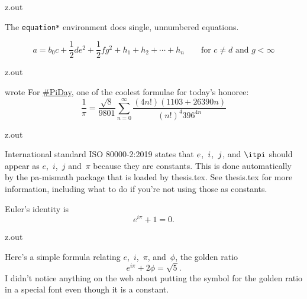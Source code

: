 \begin{VerbatimOut}{z.out}

The \verb+equation*+ environment does single, unnumbered equations.

\begin{equation*}
  a = b_0c + \frac12 de^2 + {\textstyle \frac12} fg^2
    + h_1 + h_2 + \cdots + h_n
    \qquad \text{for \(c \ne d\) and \(g < \infty\)}
\end{equation*}
\end{VerbatimOut}

\MyIO


\begin{VerbatimOut}{z.out}

\textcite{greene-2021-03-14}
wrote
  For
  \href{https://twitter.com/hashtag/PiDay?src=hashtag\_click\#PiDay}{\#PiDay},
  one of the coolest formulae for today's honoree:
  \[
    \frac 1\pi
    =
    \frac {\sqrt8} {9801}
    \sum_{n=0}^\infty
    \frac  {(4n!) (1103+26390n)}  {(n!)^4 396^{4n}}
  \]
\end{VerbatimOut}

\MyIO


\begin{VerbatimOut}{z.out}

International standard ISO 80000-2:2019
\cite{iso8000022019}
states that $\mit e$,~$\mit i$,~$\mit j$,
and $\itpi$ should appear as
$e$,~$i$,~$j$
and~$\pi$ because they are constants.
This is done automatically by the pa-mismath package
that is loaded by thesis.tex.
See thesis.tex for more information,
including what to do if you're not using those as constants.

Euler's identity is
\begin{equation*}
  e^{i\pi} + 1 = 0.
\end{equation*}
\end{VerbatimOut}

\MyIO


\begin{VerbatimOut}{z.out}

Here's a simple formula relating $e$,~$i$,~$\pi$, and~$\phi$,
the golden ratio
\begin{equation}
  e^{i\pi} + 2\phi = \sqrt 5.
\end{equation}
I didn't notice anything on the web about putting the symbol for
the golden ratio in a special font even though it is a constant.
\end{VerbatimOut}

